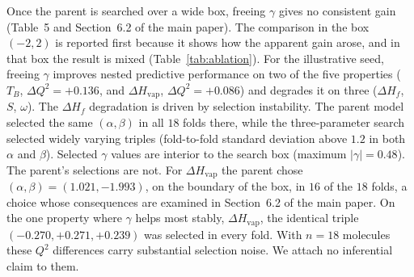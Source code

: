 \documentclass[a5paper, 10pt]{article}
\theoremstyle{plain}
\theoremstyle{remark}
\theoremstyle{definition}
\begin{document}
Once the parent is searched over a wide
box, freeing $\gamma$ gives no consistent gain
(Table~5 and Section~6.2 of the main paper). The comparison in the
box $(-2,2)$ is reported first because it shows how the apparent
gain arose, and in that box the result is mixed
(Table~\ref{tab:ablation}). For the illustrative seed, freeing $\gamma$
improves nested predictive performance on two of the five properties
($T_B$, $\Delta Q^2 = +0.136$, and $\Delta H_{\mathrm{vap}}$,
$\Delta Q^2 = +0.086$) and degrades it on three
($\Delta H_f$, $S$, $\omega$). The $\Delta H_f$ degradation is driven
by selection instability. The parent model selected the same
$(\alpha,\beta)$ in all $18$ folds there, while the three-parameter
search selected widely varying triples (fold-to-fold standard
deviation above $1.2$ in both $\alpha$ and $\beta$). Selected
$\gamma$ values are interior to the search box (maximum
$|\gamma| = 0.48$). The parent's selections are not. For
$\Delta H_{\mathrm{vap}}$ the parent chose $(\alpha,\beta) =
(1.021, -1.993)$, on the boundary of the box, in $16$ of the $18$
folds, a choice whose consequences are examined in Section~6.2
of the main paper. On the one property where
$\gamma$ helps most stably, $\Delta H_{\mathrm{vap}}$, the identical
triple $(-0.270, +0.271, +0.239)$ was selected in every fold. With
$n = 18$ molecules these $Q^2$ differences carry substantial
selection noise. We attach no inferential claim to them.
\end{document}

